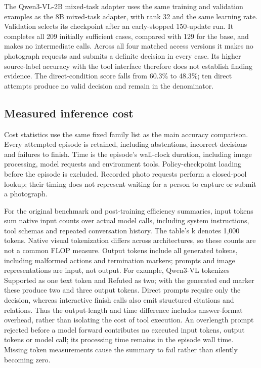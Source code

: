 The Qwen3-VL-2B mixed-task adapter uses the same training and validation examples as the 8B mixed-task adapter, with rank 32 and the same learning rate.
Validation selects its checkpoint after an early-stopped 150-update run.
It completes all 209 initially sufficient cases, compared with 129 for the base, and makes no intermediate calls.
Across all four matched access versions it makes no photograph requests and submits a definite decision in every case.
Its higher source-label accuracy with the tool interface therefore does not establish finding evidence.
The direct-condition score falls from 60.3\% to 48.3\%; ten direct attempts produce no valid decision and remain in the denominator.

\subsection{Measured inference cost}
Cost statistics use the same fixed family list as the main accuracy comparison.
Every attempted episode is retained, including abstentions, incorrect decisions and failures to finish.
Time is the episode's wall-clock duration, including image processing, model requests and environment tools.
Policy-checkpoint loading before the episode is excluded.
Recorded photo requests perform a closed-pool lookup; their timing does not represent waiting for a person to capture or submit a photograph.

For the original benchmark and post-training efficiency summaries, input tokens sum native input counts over actual model calls, including system instructions, tool schemas and repeated conversation history.
The table's k denotes 1,000 tokens.
Native visual tokenization differs across architectures, so these counts are not a common FLOP measure.
Output tokens include all generated tokens, including malformed actions and termination markers; prompts and image representations are input, not output.
For example, Qwen3-VL tokenizes Supported as one text token and Refuted as two; with the generated end marker these produce two and three output tokens. Direct prompts require only the decision, whereas interactive finish calls also emit structured citations and relations. Thus the output-length and time difference includes answer-format overhead, rather than isolating the cost of tool execution.
An overlength prompt rejected before a model forward contributes no executed input tokens, output tokens or model call; its processing time remains in the episode wall time.
Missing token measurements cause the summary to fail rather than silently becoming zero.


